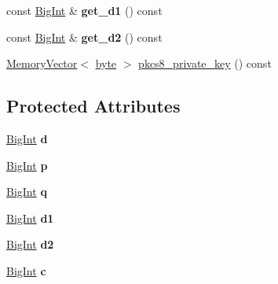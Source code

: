 \begin{DoxyCompactItemize}
\item 
\hypertarget{classBotan_1_1IF__Scheme__PrivateKey_a3c31f142c2ed392a16b3f10e0205ff5b}{const \hyperlink{classBotan_1_1BigInt}{Big\-Int} \& {\bfseries get\-\_\-d1} () const }\label{classBotan_1_1IF__Scheme__PrivateKey_a3c31f142c2ed392a16b3f10e0205ff5b}

\item 
\hypertarget{classBotan_1_1IF__Scheme__PrivateKey_a2320241b2c0cbc8e1c87280a86b92265}{const \hyperlink{classBotan_1_1BigInt}{Big\-Int} \& {\bfseries get\-\_\-d2} () const }\label{classBotan_1_1IF__Scheme__PrivateKey_a2320241b2c0cbc8e1c87280a86b92265}

\item 
\hyperlink{classBotan_1_1MemoryVector}{Memory\-Vector}$<$ \hyperlink{namespaceBotan_a7d793989d801281df48c6b19616b8b84}{byte} $>$ \hyperlink{classBotan_1_1IF__Scheme__PrivateKey_a165fdaed320976e020c1c0fe241e02f9}{pkcs8\-\_\-private\-\_\-key} () const 
\end{DoxyCompactItemize}
\subsection*{Protected Attributes}
\begin{DoxyCompactItemize}
\item 
\hypertarget{classBotan_1_1IF__Scheme__PrivateKey_a321e9d68210586fae9afe9222b4eaf97}{\hyperlink{classBotan_1_1BigInt}{Big\-Int} {\bfseries d}}\label{classBotan_1_1IF__Scheme__PrivateKey_a321e9d68210586fae9afe9222b4eaf97}

\item 
\hypertarget{classBotan_1_1IF__Scheme__PrivateKey_ae53f2affd802dd97a1c4fb0f8d9eda5a}{\hyperlink{classBotan_1_1BigInt}{Big\-Int} {\bfseries p}}\label{classBotan_1_1IF__Scheme__PrivateKey_ae53f2affd802dd97a1c4fb0f8d9eda5a}

\item 
\hypertarget{classBotan_1_1IF__Scheme__PrivateKey_ad0d0b9e72aab4c1d50b69655324c71b5}{\hyperlink{classBotan_1_1BigInt}{Big\-Int} {\bfseries q}}\label{classBotan_1_1IF__Scheme__PrivateKey_ad0d0b9e72aab4c1d50b69655324c71b5}

\item 
\hypertarget{classBotan_1_1IF__Scheme__PrivateKey_aa96788650540a204320c2838b7d71158}{\hyperlink{classBotan_1_1BigInt}{Big\-Int} {\bfseries d1}}\label{classBotan_1_1IF__Scheme__PrivateKey_aa96788650540a204320c2838b7d71158}

\item 
\hypertarget{classBotan_1_1IF__Scheme__PrivateKey_a9ee03e707418134aa4c2f1934ea8dbe6}{\hyperlink{classBotan_1_1BigInt}{Big\-Int} {\bfseries d2}}\label{classBotan_1_1IF__Scheme__PrivateKey_a9ee03e707418134aa4c2f1934ea8dbe6}

\item 
\hypertarget{classBotan_1_1IF__Scheme__PrivateKey_a6996889aa195fa7de552a8de8891306a}{\hyperlink{classBotan_1_1BigInt}{Big\-Int} {\bfseries c}}\label{classBotan_1_1IF__Scheme__PrivateKey_a6996889aa195fa7de552a8de8891306a}

\end{DoxyCompactItemize}
